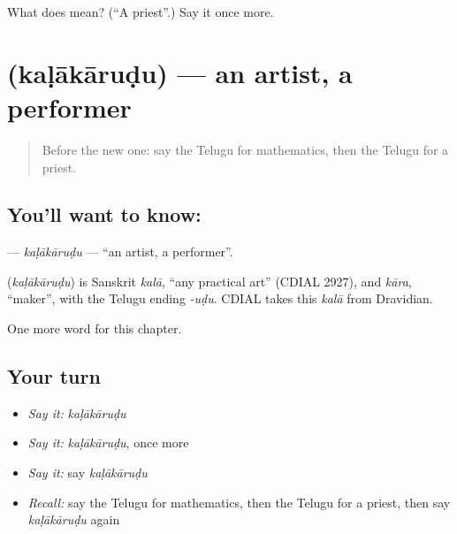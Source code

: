 \begin{tcolorbox}[breakable,colback=teal!4,colframe=teal!35!black,title={Before you move on}]
What does  mean? (\textquotedblleft{}A priest\textquotedblright{}.) Say it once more.
\end{tcolorbox}
\section[\texorpdfstring{\te{కళాకారుడు} (kaḷākāruḍu)}{కళాకారుడు (kaḷākāruḍu)}]{ (kaḷākāruḍu) — an artist, a performer}

\label{lesson:TE-C275-kalakarudu}



\begin{quote}
Before the new one: say the Telugu for mathematics, then the Telugu for a priest.
\end{quote}

\subsection*{You'll want to know: }
\textbf{} — \emph{kaḷākāruḍu} — \textquotedblleft{}an artist, a performer\textquotedblright{}.

\begin{cousinweb}
\textbf{} (\emph{kaḷākāruḍu}) is Sanskrit \emph{kalā}, \textquotedblleft{}any practical art\textquotedblright{} (CDIAL 2927), and \emph{kāra}, \textquotedblleft{}maker\textquotedblright{}, with the Telugu ending \emph{-uḍu}. CDIAL takes this \emph{kalā} from Dravidian.
\end{cousinweb}

\begin{grammarlens}[title={What you've built}]
One more word for this chapter.
\end{grammarlens}

\subsection*{Your turn}
\begin{itemize}
\raggedright
  \item \emph{Say it:} \emph{kaḷākāruḍu}
  \item \emph{Say it:} \emph{kaḷākāruḍu}, once more
  \item \emph{Say it:} say \emph{kaḷākāruḍu}
  \item \emph{Recall:} say the Telugu for mathematics, then the Telugu for a priest, then say \emph{kaḷākāruḍu} again
\end{itemize}

